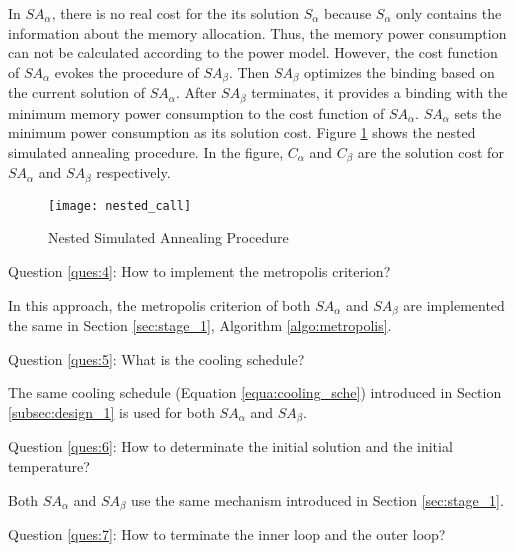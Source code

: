 		In $SA_{\alpha}$, there is no real cost for the its solution $S_{\alpha}$
		because $S_{\alpha}$ only contains the information about the memory allocation.
		Thus, the memory power consumption can not be calculated according to the
		power model.
		However, the cost function of $SA_{\alpha}$ evokes the procedure of $SA_{\beta}$.
		Then $SA_{\beta}$ optimizes the binding based on the current solution
		of $SA_{\alpha}$. After $SA_{\beta}$ terminates, it provides a binding with
		the minimum memory power consumption to the cost function of $SA_{\alpha}$.
		$SA_{\alpha}$ sets the minimum power consumption as its solution cost.
		Figure \ref{fig:nested_call} shows the nested simulated annealing procedure.
		In the figure, $C_{\alpha}$ and $C_{\beta}$ are the solution cost for $SA_{\alpha}$
		and $SA_{\beta}$ respectively.
		\begin{figure}[h]
			\begin{center}
				\texttt{[image: nested\_call]}
				\caption{Nested Simulated Annealing Procedure}
				\label{fig:nested_call}
			\end{center}
		\end{figure}

		Question \ref{ques:4}: How to implement the metropolis criterion?

		In this approach, the metropolis criterion of both $SA_{\alpha}$ and
		$SA_{\beta}$ are implemented the same in Section \ref{sec:stage_1},
		Algorithm \ref{algo:metropolis}.
		
		Question \ref{ques:5}: What is the cooling schedule?
		
		The same cooling schedule (Equation \ref{equa:cooling_sche}) introduced
		in Section \ref{subsec:design_1} is used for both $SA_{\alpha}$ and $SA_{\beta}$.
		
		Question \ref{ques:6}: How to determinate the initial solution and the
		initial temperature?
		
		Both $SA_{\alpha}$ and $SA_{\beta}$ use the same mechanism introduced in Section
		\ref{sec:stage_1}.
		
		Question \ref{ques:7}: How to terminate the inner loop and the outer loop?
	
